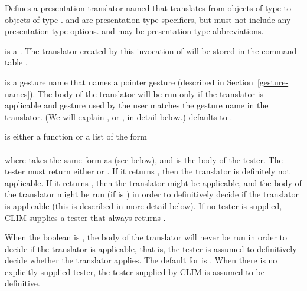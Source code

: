 Defines a presentation translator named  that translates from objects
of type  to objects of type .   and
 are presentation type specifiers, but must not include any
presentation type options.   and  may be
presentation type abbreviations.

 is a .  The translator created
by this invocation of  will be stored in the
command table .

 is a gesture name that names a pointer gesture (described in
Section~\ref{gesture-names}).  The body of the translator will be run only if
the translator is applicable and gesture used by the user matches the gesture
name in the translator.  (We will explain , or
, in detail below.)   defaults to .

 is either a function or a list of the form
\\
\\
where  takes the same form as  (see below), and
 is the body of the tester.  The tester must return either
 or .  If it returns , then the translator is
definitely not applicable.  If it returns , then the translator might
be applicable, and the body of the translator might be run (if
 is ) in order to definitively decide if the
translator is applicable (this is described in more detail below).  If no tester
is supplied, CLIM supplies a tester that always returns .

When the boolean  is , the body of the
translator will never be run in order to decide if the translator is applicable,
that is, the tester is assumed to definitively decide whether the translator
applies.  The default for  is .  When there
is no explicitly supplied tester, the tester supplied by CLIM is assumed to be
definitive.

